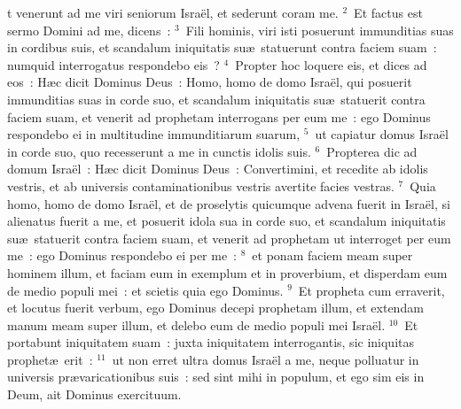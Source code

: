 \bchapter
{}t venerunt ad me viri seniorum Isra\"el, et sederunt coram me.
${}^{2}$~Et factus est sermo Domini ad me, dicens~:
${}^{3}$~Fili hominis, viri isti posuerunt immunditias suas in cordibus suis, et scandalum iniquitatis su\ae\ statuerunt contra faciem suam~: numquid interrogatus respondebo eis~?
${}^{4}$~Propter hoc loquere eis, et dices ad eos~: H\ae c dicit Dominus Deus~: Homo, homo de domo Isra\"el, qui posuerit immunditias suas in corde suo, et scandalum iniquitatis su\ae\ statuerit contra faciem suam, et venerit ad prophetam interrogans per eum me~: ego Dominus respondebo ei in multitudine immunditiarum suarum,
${}^{5}$~ut capiatur domus Isra\"el in corde suo, quo recesserunt a me in cunctis idolis suis.
${}^{6}$~Propterea dic ad domum Isra\"el~: H\ae c dicit Dominus Deus~: Convertimini, et recedite ab idolis vestris, et ab universis contaminationibus vestris avertite facies vestras.
${}^{7}$~Quia homo, homo de domo Isra\"el, et de proselytis quicumque advena fuerit in Isra\"el, si alienatus fuerit a me, et posuerit idola sua in corde suo, et scandalum iniquitatis su\ae\ statuerit contra faciem suam, et venerit ad prophetam ut interroget per eum me~: ego Dominus respondebo ei per me~:
${}^{8}$~et ponam faciem meam super hominem illum, et faciam eum in exemplum et in proverbium, et disperdam eum de medio populi mei~: et scietis quia ego Dominus.
${}^{9}$~Et propheta cum erraverit, et locutus fuerit verbum, ego Dominus decepi prophetam illum, et extendam manum meam super illum, et delebo eum de medio populi mei Isra\"el.
${}^{10}$~Et portabunt iniquitatem suam~: juxta iniquitatem interrogantis, sic iniquitas prophet\ae\ erit~:
${}^{11}$~ut non erret ultra domus Isra\"el a me, neque polluatur in universis pr\ae varicationibus suis~: sed sint mihi in populum, et ego sim eis in Deum, ait Dominus exercituum.



